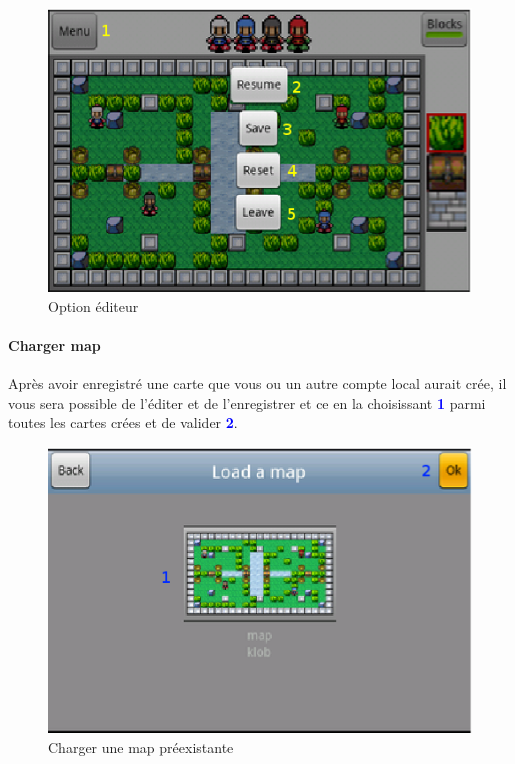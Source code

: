 	\begin{figure}[h]
	\centering
		\includegraphics[scale=0.7]{Manuel/Img/13.eps}
		\caption{Option éditeur}
	\end{figure}
	
	\paragraph{Charger map\\}
	Après avoir enregistré une carte que vous ou un autre compte local aurait crée,
	il vous sera possible de l'éditer et de l'enregistrer et ce en la choisissant
	\textcolor{blue}{\textbf{1}} parmi toutes les cartes crées et de valider
	\textcolor{blue}{\textbf{2}}. \begin{figure}[h]
	\centering
		\includegraphics[scale=0.7]{Manuel/Img/14.eps}
		\caption{Charger une map préexistante}
	\end{figure}
	

